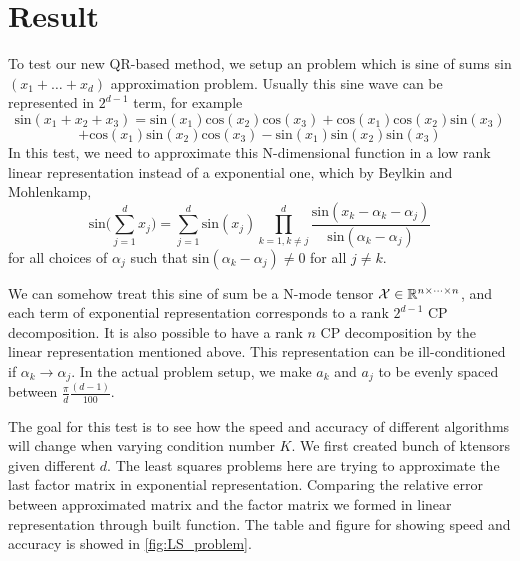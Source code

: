 \documentclass{article}
\newcommand{\T}[2][]{#1{\mathbf{\cal{#2}}}} 						%
\begin{document}
  




\section{Result}
To test our new QR-based method, we setup an problem which is sine of sums sin$(x_1+\dots+ x_d)$ approximation problem.
Usually this sine wave can be represented in $2^{d-1}$ term, for example
$$\text{sin}(x_1+x_2+x_3) = \text{sin}(x_1)\text{cos}(x_2)\text{cos}(x_3)+\text{cos}(x_1)\text{cos}(x_2)\text{sin}(x_3)$$
$$+\text{cos}(x_1)\text{sin}(x_2)\text{cos}(x_3) - \text{sin}(x_1)\text{sin}(x_2)\text{sin}(x_3)$$
In this test, we need to approximate this N-dimensional function in a low rank linear representation instead of a exponential one, which by Beylkin and Mohlenkamp,
$$\text{sin}\bigl(\sum^d_{j=1}x_j\bigr) = \sum^d_{j=1}\text{sin}(x_j)\prod^d_{k=1,k\neq j}\frac{\text{sin}(x_k - \alpha_k -\alpha_j)}{\text{sin}(\alpha_k - \alpha_j)}$$
for all choices of  ${\alpha_j}$ such that $\text{sin}(\alpha_k - \alpha_j) \neq 0$ for all $j \neq k$.

We can somehow treat this sine of sum be a N-mode tensor $\T{X} \in \mathbb{R}^{n \times \dots \times n}$, and each term of exponential representation corresponds to a rank $2^{d-1}$ CP decomposition. 
It is also possible to have a rank $n$ CP decomposition by the linear representation mentioned above. 
This representation can be ill-conditioned if $\alpha_k \rightarrow \alpha_j$.
In the actual problem setup, we make $a_k$ and $a_j$ to be evenly spaced between $\frac{\pi}{d}\frac{(d-1)}{100}$. 

The goal for this test is to see how the speed and accuracy of different algorithms will change when varying condition number $K$.
We first created bunch of ktensors given different $d$. The least squares problems here are trying to approximate the last factor matrix in exponential representation. Comparing the relative error between approximated matrix and the factor matrix we formed in linear representation through built function. 
The table and figure for showing speed and accuracy is showed in \cref{fig:LS_problem}.
\end{document}
